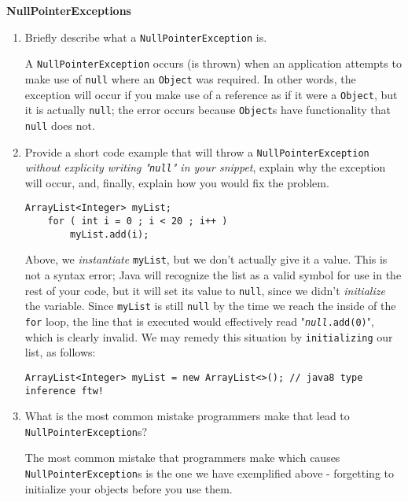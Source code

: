 \textbf{NullPointerExceptions}
\begin{enumerate}
	\item Briefly describe what a \texttt{NullPointerException} is.\\
	\begin{answer}
		A \texttt{NullPointerException} occurs (is thrown) when an application attempts to make use of \texttt{null} where an \texttt{Object} was required. In other words, the exception will occur if you make use of a reference as if it were a \texttt{Object}, but it is actually \texttt{null}; the error occurs because \texttt{Object}s have functionality that \texttt{null} does not.
	\end{answer}
	\item Provide a short code example that will throw a \texttt{NullPointerException} \textit{without explicity writing "\texttt{null}" in your snippet}, explain why the exception will occur, and, finally, explain how you would fix the problem.
	\begin{answer}
		\begin{lstlisting}[numbers=none]
	ArrayList<Integer> myList;
	for ( int i = 0 ; i < 20 ; i++ )
		myList.add(i);
		\end{lstlisting}
		Above, we \textit{instantiate} \texttt{myList}, but we don't actually give it a value. This is not a syntax error; Java will recognize the list as a valid symbol for use in the rest of your code, but it will set its value to \texttt{null}, since we didn't \textit{initialize} the variable. Since \texttt{myList} is still \texttt{null} by the time we reach the inside of the \texttt{for} loop, the line that is executed would effectively read "\texttt{\textit{null}.add(0)}", which is clearly invalid.
		We may remedy this situation by \texttt{initializing} our list, as follows:
		\begin{lstlisting}[numbers=none]
	ArrayList<Integer> myList = new ArrayList<>(); // java8 type inference ftw!
		\end{lstlisting}
	\end{answer}
	\item What is the most common mistake programmers make that lead to \texttt{NullPointerException}s?\\
	\begin{answer}
		The most common mistake that programmers make which causes \texttt{NullPointerException}s is the one we have exemplified above - forgetting to initialize your objects before you use them.
	\end{answer}
\end{enumerate}
